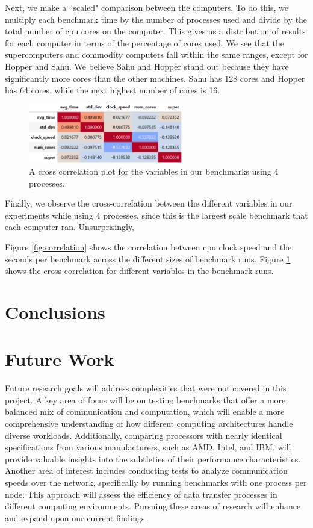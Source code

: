 \documentclass{article}
\newcommand\todoChris[1]{\todo[author=Chris,color=orange,inline]{#1}}
\begin{document}
Next, we make a ``scaled" comparison between the computers. To do this, we multiply each benchmark time by the number of processes used and divide by the total number of cpu cores on the computer. This gives us a distribution of results for each computer in terms of the percentage of cores used. We see that the supercomputers and commodity computers fall within the same ranges, except for Hopper and Sahu. We believe Sahu and Hopper stand out because they have significantly more cores than the other machines. Sahu has 128 cores and Hopper has 64 cores, while the next highest number of cores is 16.

\begin{figure}[h]
    \centering
    \includegraphics[width=0.6\textwidth]{figures/final/xcorr.png}
    \caption{A cross correlation plot for the variables in our benchmarks using 4 processes. }
    \label{fig:xcorrelation}
\end{figure}

Finally, we observe the cross-correlation between the different variables in our experiments while using 4 processes, since this is the largest scale benchmark that each computer ran.
Unsurprisingly, 

Figure \ref{fig:correlation} shows the correlation between cpu clock speed and the seconds per benchmark across the different sizes of benchmark runs. Figure \ref{fig:xcorrelation} shows the cross correlation for different variables in the benchmark runs.

\section{Conclusions}
\todoChris{}

\section{Future Work}
Future research goals will address complexities that were not covered in this project. A key area of focus will be on testing benchmarks that offer a more balanced mix of communication and computation, which will enable a more comprehensive understanding of how different computing architectures handle diverse workloads. Additionally, comparing processors with nearly identical specifications from various manufacturers, such as AMD, Intel, and IBM, will provide valuable insights into the subtleties of their performance characteristics. Another area of interest includes conducting tests to analyze communication speeds over the network, specifically by running benchmarks with one process per node. This approach will assess the efficiency of data transfer processes in different computing environments. Pursuing these areas of research will enhance and expand upon our current findings.
\printbibliography
\end{document}
